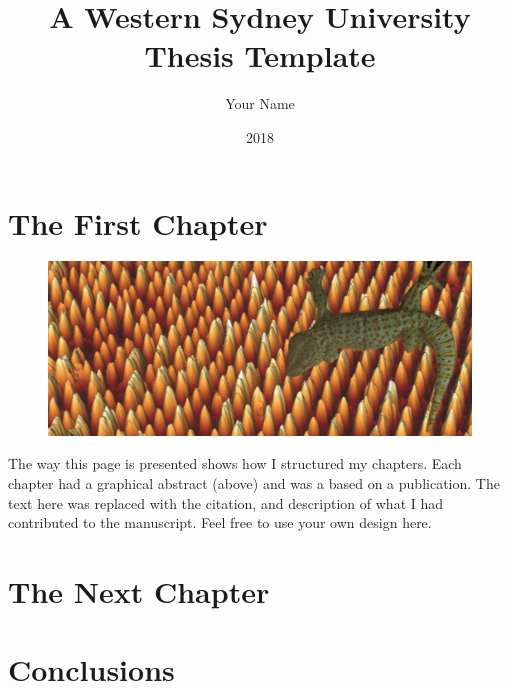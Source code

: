 \documentclass[12pt,openright,twoside]{report} %
\title{A Western Sydney University Thesis Template}	%
\author{Your Name} %
\date{2018}
\renewcommand{\baselinestretch}{2}	%
\begin{document}
	\renewcommand{\baselinestretch}{2} %
	\cleardoublepage
	
	\clearpage
	
	\renewcommand{\baselinestretch}{1.5}\normalsize
	\tableofcontents
	\listoffigures
	\listoftables
	
	\renewcommand{\baselinestretch}{2}\normalsize
	\cleardoublepage
	

	\chapter{The First Chapter} \label{Chapter 1}
	\pagestyle{fancy}
		\begin{figure}[!h]
		\centering
		\includegraphics[width=\textwidth]{chapter1abs}	
		\end{figure}
	\noindent The way this page is presented shows how I structured my chapters. Each chapter had a graphical abstract (above) and was a based on a publication. The text here was replaced with the citation, and description of what I had contributed to the manuscript. Feel free to use your own design here.
	\clearpage
	

	\chapter{The Next Chapter} \label{Chapter 2}
	
	
	
	\chapter{Conclusions}
	
\end{document}
